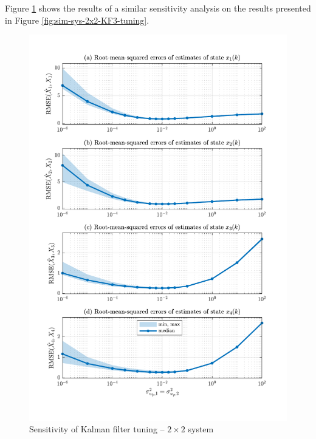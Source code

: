 Figure \ref{fig:sim-sys-2x2-KF3-tuning-sens} shows the results of a similar sensitivity analysis on the results presented in Figure \ref{fig:sim-sys-2x2-KF3-tuning}.

\begin{figure}[htp]
	\centering
	\includegraphics[width=14cm]{images/rod_obs_sim2_3KF_Q_statplot.pdf}
	\caption{Sensitivity of Kalman filter tuning – $2\times2$ system}
	\label{fig:sim-sys-2x2-KF3-tuning-sens}
\end{figure}

